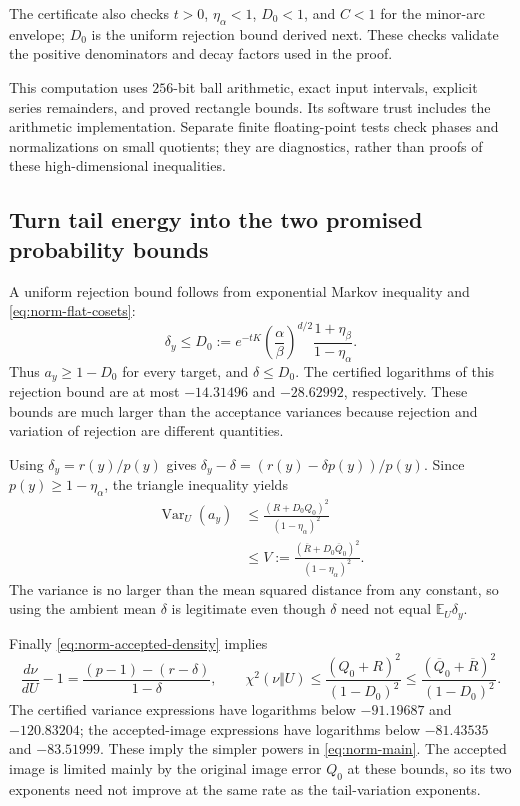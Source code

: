 \documentclass[11pt,a4paper]{article}
\newcommand{\E}{\mathbb E}
\theoremstyle{definition}
\theoremstyle{remark}
\numberwithin{equation}{section}
\begin{document}
The certificate also checks $t>0$, $\eta_\alpha<1$, $D_0<1$, and
$C<1$ for the minor-arc envelope; $D_0$ is the uniform rejection bound derived next. These checks validate the positive
denominators and decay factors used in the proof.

This computation uses $256$-bit ball arithmetic, exact input intervals,
explicit series remainders, and proved rectangle bounds. Its software
trust includes the arithmetic implementation. Separate finite
floating-point tests check phases and normalizations on small quotients;
they are diagnostics, rather than proofs of these high-dimensional
inequalities.

\subsection{Turn tail energy into the two promised probability bounds}

A uniform rejection bound follows from exponential Markov inequality
and \eqref{eq:norm-flat-cosets}:
\begin{equation}
 \delta_y\le D_0:=e^{-tK}
 \left(\frac\alpha\beta\right)^{d/2}
 \frac{1+\eta_\beta}{1-\eta_\alpha}.
 \label{eq:norm-D0}
\end{equation}
Thus $a_y\ge1-D_0$ for every target, and $\delta\le D_0$. The
certified logarithms of this rejection bound are at most $-14.31496$
and $-28.62992$, respectively. These bounds are much larger than the
acceptance variances because rejection and variation of rejection are
different quantities.

Using $\delta_y=r(y)/p(y)$ gives
$\delta_y-\delta=(r(y)-\delta p(y))/p(y)$. Since
$p(y)\ge1-\eta_\alpha$, the triangle inequality yields
\begin{equation}
\begin{aligned}
 \operatorname{Var}_U(a_y)
 &\le\frac{(R+D_0Q_0)^2}{(1-\eta_\alpha)^2}\\
 &\le V:=\frac{(\overline R+D_0\overline Q_0)^2}
 {(1-\eta_\alpha)^2}.
\end{aligned}
 \label{eq:norm-variance}
\end{equation}
The variance is no larger than the mean squared distance from any
constant, so using the ambient mean $\delta$ is legitimate even though
$\delta$ need not equal $\E_U\delta_y$.

Finally \eqref{eq:norm-accepted-density} implies
\[
 \frac{d\nu}{dU}-1
   =\frac{(p-1)-(r-\delta)}{1-\delta},\qquad
 \chi^2(\nu\Vert U)
   \le\frac{(Q_0+R)^2}{(1-D_0)^2}
   \le\frac{(\overline Q_0+\overline R)^2}{(1-D_0)^2}.
\]
The certified variance expressions have logarithms below
$-91.19687$ and $-120.83204$; the accepted-image expressions have
logarithms below $-81.43535$ and $-83.51999$. These imply the simpler
powers in \eqref{eq:norm-main}. The accepted image is limited mainly
by the original image error $Q_0$ at these bounds, so its two exponents
need not improve at the same rate as the tail-variation exponents.
\end{document}
